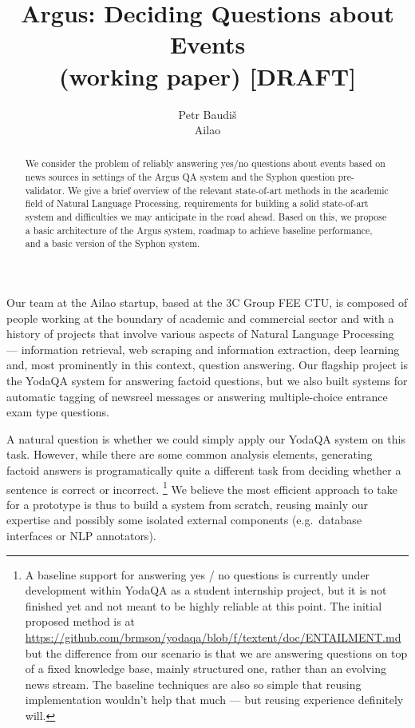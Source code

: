 \documentclass[11pt,a4paper]{article}
\title{Argus: Deciding Questions about Events \\ (working paper) [DRAFT]}
\author{Petr Baudiš \\ Ailao}
\begin{document}
\maketitle

\begin{abstract}%
	We consider the problem of reliably answering yes/no questions
	about events based on news sources in settings of the Argus QA
	system and the Syphon question pre-validator.
	We give a brief overview of the relevant state-of-art methods
	in the academic field of Natural Language Processing,
	requirements for building a solid state-of-art system
	and difficulties we may anticipate in the road ahead.
	Based on this, we propose a basic architecture of the Argus
	system, roadmap to achieve baseline performance, and a basic
	version of the Syphon system.
\end{abstract}

\vspace{3ex}

Our team at the Ailao startup, based at the 3C Group FEE CTU,
is composed of people working at the boundary of academic and commercial
sector and with a history of projects that involve
various aspects of Natural Language Processing ---
information retrieval, web scraping and information extraction,
deep learning and, most prominently in this context, question answering.
Our flagship project is the YodaQA system for answering factoid questions,
but we also built systems for automatic tagging of newsreel messages
or answering multiple-choice entrance exam type questions.

A natural question is whether we could simply apply our YodaQA system
on this task.  However, while there are some common analysis elements,
generating factoid answers is programatically quite a different task
from deciding whether a sentence is correct or incorrect.%
\footnote{A baseline support for answering yes / no questions is currently
under development within YodaQA as a student internship project, but it is
not finished yet and not meant to be highly reliable at this point.
The initial proposed method is at
\url{https://github.com/brmson/yodaqa/blob/f/textent/doc/ENTAILMENT.md}
but the difference from our scenario is that we are answering questions
on top of a fixed knowledge base, mainly structured one, rather than an
evolving news stream.  The baseline techniques are also so simple that
reusing implementation wouldn't help that much --- but reusing experience
definitely will.}
We believe the most efficient approach to take for a prototype is thus
to build a system from scratch, reusing mainly our expertise and possibly
some isolated external components (e.g.\ database interfaces or NLP annotators).
\end{document}
